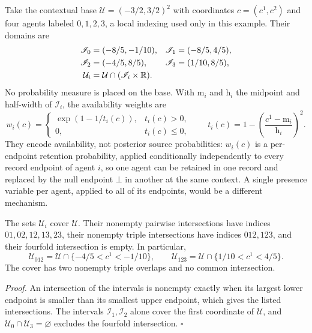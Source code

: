 Take the contextual base \(\mathcal U=(-3/2,3/2)^2\) with coordinates
\(c=(c^1,c^2)\) and four agents labeled \(0,1,2,3\), a local indexing used only
in this example. Their domains are
\begin{equation}
\begin{aligned}
 \mathscr I_0&=(-8/5,-1/10),& \mathscr I_1&=(-8/5,4/5),\\
 \mathscr I_2&=(-4/5,8/5),& \mathscr I_3&=(1/10,8/5),\\
 \mathcal U_i&=\mathcal U\cap(\mathscr I_i\times\mathbb R).
\end{aligned}
\label{eq:rg-cover-open-domains}
\end{equation}
No probability measure is placed on the base. With \(\mathrm m_i\) and
\(\mathrm h_i\) the midpoint and half-width of \(\mathscr I_i\), the availability
weights are
\begin{equation}
 w_i(c)=
 \begin{cases}
 \exp(1-1/t_i(c)),&t_i(c)>0,\\
 0,&t_i(c)\leq0,
 \end{cases}
 \qquad t_i(c)=1-\left(\frac{c^1-\mathrm m_i}{\mathrm h_i}\right)^2.
\label{eq:rg-cover-bumps}
\end{equation}
They encode availability, not posterior source probabilities: \(w_i(c)\) is a
per-endpoint retention probability, applied conditionally independently to every
record endpoint of agent \(i\), so one agent can be retained in one record and
replaced by the null endpoint \(\bot\) in another at the same context. A single
presence variable per agent, applied to all of its endpoints, would be a
different mechanism.

The sets \(\mathcal U_i\) cover \(\mathcal U\). Their nonempty pairwise
intersections have indices \(01,02,12,13,23\), their nonempty triple
intersections have indices \(012,123\), and their fourfold intersection is empty.
In particular,
\begin{equation}
 \mathcal U_{012}=\mathcal U\cap\{-4/5<c^1<-1/10\},\qquad
 \mathcal U_{123}=\mathcal U\cap\{1/10<c^1<4/5\}.
\label{eq:rg-cover-triples}
\end{equation}
The cover has two nonempty triple overlaps and no common intersection.

\noindent\emph{Proof.}
An intersection of the intervals is nonempty exactly when its largest lower
endpoint is smaller than its smallest upper endpoint, which gives the listed
intersections. The intervals \(\mathscr I_1,\mathscr I_2\) alone cover the first
coordinate of \(\mathcal U\), and \(\mathcal U_0\cap\mathcal U_3=\varnothing\)
excludes the fourfold intersection. \(\square\)

